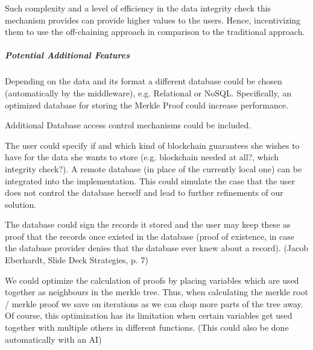Such complexity and a level of efficiency in the data integrity check this mechanism provides can provide higher values to the users. Hence, incentivizing them to use the off-chaining approach in comparison to the traditional approach.

\subparagraph{Potential Additional Features}
Depending on the data and its format a different database could be chosen (automatically by the middleware), e.g. Relational or NoSQL. Specifically, an optimized database for storing the Merkle Proof could increase performance.

Additional Database access control mechanisms could be included.

The user could specify if and which kind of blockchain guarantees she wishes to have for the data she wants to store (e.g. blockchain needed at all?, which integrity check?).
A remote database (in place of the currently local one) can be integrated into the implementation. This could simulate the case that the user does not control the database herself and lead to further refinements of our solution.

The database could sign the records it stored and the user may keep these as proof that the records once existed in the database (proof of existence, in case the database provider denies that the database ever knew about a record). (Jacob Eberhardt, Slide Deck Strategies, p. 7)

We could optimize the calculation of proofs by placing variables which are used together as neighbours in the merkle tree. Thus, when calculating the merkle root / merkle proof we save on iterations as we can chop more parts of the tree away. Of course, this optimization has its limitation when certain variables get used together with multiple others in different functions. (This could also be done automatically with an AI)
